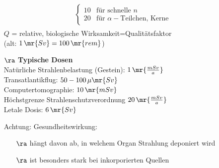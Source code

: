\begin{itemize}
\begin{align}
\begin{split}
\begin{cases}
10 & \text{für schnelle }n \\
20 & \text{für }\alpha-\text{Teilchen, Kerne}
\end{cases}
\end{split}
\end{align}
$Q$ = relative, biologische Wirksamkeit=\glqq Qualitätsfaktor\grqq\\
(alt: $1\,\mr{Sv}=100\,\mr{rem}$)
\item[$\ra$] \textbf{Typische Dosen}\\
Natürliche Strahlenbelastung (Gestein): $1\,\mr{\frac{mSv}{a}}$\\
Transatlantikflug: $50-100\,\mu \mr{Sv}$\\
Computertomographie: $10\,\mr{mSv}$\\
Höchstgrenze Strahlenschutzverordnung $20\,\mr{\frac{mSv}{a}}$\\
Letale Dosis: $6\,\mr{Sv}$

Achtung: Gesundheitswirkung:
\begin{itemize}
\item[$\ra$] hängt davon ab, in welchem Organ Strahlung deponiert wird
\item[$\ra$] ist besonders stark bei inkorporierten Quellen
\end{itemize}
\end{itemize}